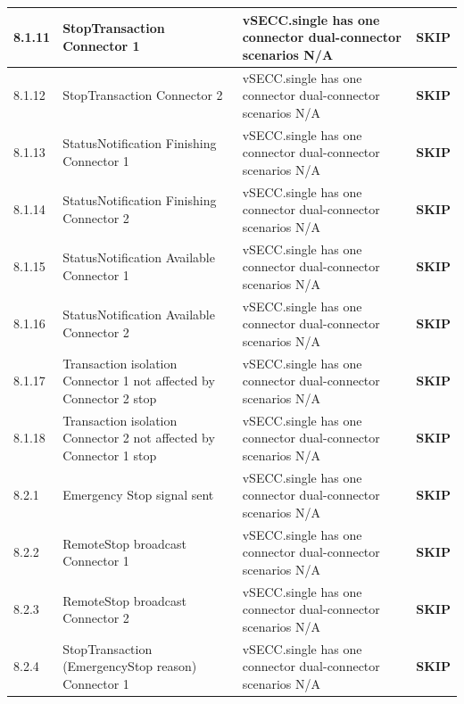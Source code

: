 \documentclass[10pt, a4paper]{article}
\begin{document}
\begin{longtable}{|L{1cm}|L{5.5cm}|M{7cm}|C{1.8cm}|}
\hline
\small 8.1.11 & \small StopTransaction  Connector 1 & vSECC.single has one connector  dual-connector scenarios N/A & \textcolor{skipgray}{\textbf{SKIP}} \\
\hline
\small 8.1.12 & \small StopTransaction  Connector 2 & vSECC.single has one connector  dual-connector scenarios N/A & \textcolor{skipgray}{\textbf{SKIP}} \\
\hline
\small 8.1.13 & \small StatusNotification Finishing  Connector 1 & vSECC.single has one connector  dual-connector scenarios N/A & \textcolor{skipgray}{\textbf{SKIP}} \\
\hline
\small 8.1.14 & \small StatusNotification Finishing  Connector 2 & vSECC.single has one connector  dual-connector scenarios N/A & \textcolor{skipgray}{\textbf{SKIP}} \\
\hline
\small 8.1.15 & \small StatusNotification Available  Connector 1 & vSECC.single has one connector  dual-connector scenarios N/A & \textcolor{skipgray}{\textbf{SKIP}} \\
\hline
\small 8.1.16 & \small StatusNotification Available  Connector 2 & vSECC.single has one connector  dual-connector scenarios N/A & \textcolor{skipgray}{\textbf{SKIP}} \\
\hline
\small 8.1.17 & \small Transaction isolation  Connector 1 not affected by Connector 2 stop & vSECC.single has one connector  dual-connector scenarios N/A & \textcolor{skipgray}{\textbf{SKIP}} \\
\hline
\small 8.1.18 & \small Transaction isolation  Connector 2 not affected by Connector 1 stop & vSECC.single has one connector  dual-connector scenarios N/A & \textcolor{skipgray}{\textbf{SKIP}} \\
\hline
\small 8.2.1 & \small Emergency Stop signal sent & vSECC.single has one connector  dual-connector scenarios N/A & \textcolor{skipgray}{\textbf{SKIP}} \\
\hline
\small 8.2.2 & \small RemoteStop broadcast  Connector 1 & vSECC.single has one connector  dual-connector scenarios N/A & \textcolor{skipgray}{\textbf{SKIP}} \\
\hline
\small 8.2.3 & \small RemoteStop broadcast  Connector 2 & vSECC.single has one connector  dual-connector scenarios N/A & \textcolor{skipgray}{\textbf{SKIP}} \\
\hline
\small 8.2.4 & \small StopTransaction (EmergencyStop reason)  Connector 1 & vSECC.single has one connector  dual-connector scenarios N/A & \textcolor{skipgray}{\textbf{SKIP}} \\
\hline

\end{longtable}
\end{document}
